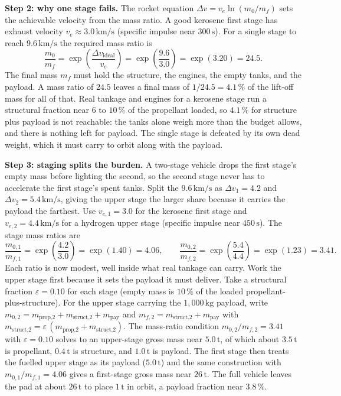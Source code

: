 \textbf{Step 2: why one stage fails.} The rocket equation $\Delta
v=v_{e}\ln(m_{0}/m_{f})$ sets the achievable velocity from the mass
ratio. A good kerosene first stage has exhaust velocity $v_{e}\approx
3.0\,\si{\kilo\meter\per\second}$ (specific impulse near
$300\,\si{\second}$). For a single stage to reach
$9.6\,\si{\kilo\meter\per\second}$ the required mass ratio is
\[
\frac{m_{0}}{m_{f}}=\exp\!\left(\frac{\Delta v_{\text{ideal}}}{v_{e}}
\right)=\exp\!\left(\frac{9.6}{3.0}\right)=\exp(3.20)=24.5.
\]
The final mass $m_{f}$ must hold the structure, the engines, the empty
tanks, and the payload. A mass ratio of $24.5$ leaves a final mass of
$1/24.5=4.1\,\%$ of the lift-off mass for all of that. Real tankage and
engines for a kerosene stage run a structural fraction near $6$ to
$10\,\%$ of the propellant loaded, so $4.1\,\%$ for structure plus
payload is not reachable: the tanks alone weigh more than the budget
allows, and there is nothing left for payload. The single stage is
defeated by its own dead weight, which it must carry to orbit along
with the payload.

\textbf{Step 3: staging splits the burden.} A two-stage vehicle drops
the first stage's empty mass before lighting the second, so the second
stage never has to accelerate the first stage's spent tanks. Split the
$9.6\,\si{\kilo\meter\per\second}$ as $\Delta v_{1}=4.2$ and $\Delta
v_{2}=5.4\,\si{\kilo\meter\per\second}$, giving the upper stage the
larger share because it carries the payload the farthest. Use $v_{e,1}=
3.0$ for the kerosene first stage and $v_{e,2}=4.4\,\si{\kilo\meter\per
\second}$ for a hydrogen upper stage (specific impulse near
$450\,\si{\second}$). The stage mass ratios are
\[
\frac{m_{0,1}}{m_{f,1}}=\exp\!\left(\frac{4.2}{3.0}\right)=\exp(1.40)=
4.06,\qquad
\frac{m_{0,2}}{m_{f,2}}=\exp\!\left(\frac{5.4}{4.4}\right)=\exp(1.23)=
3.41.
\]
Each ratio is now modest, well inside what real tankage can carry.
Work the upper stage first because it sets the payload it must deliver.
Take a structural fraction $\varepsilon=0.10$ for each stage (empty
mass is $10\,\%$ of the loaded propellant-plus-structure). For the
upper stage carrying the $1{,}000\,\si{\kilogram}$ payload, write
$m_{0,2}=m_{\text{prop,2}}+m_{\text{struct,2}}+m_{\text{pay}}$ and
$m_{f,2}=m_{\text{struct,2}}+m_{\text{pay}}$ with
$m_{\text{struct,2}}=\varepsilon\,(m_{\text{prop,2}}+m_{\text{struct,2}})$.
The mass-ratio condition $m_{0,2}/m_{f,2}=3.41$ with $\varepsilon=0.10$
solves to an upper-stage gross mass near $5.0\,\si{\tonne}$, of which
about $3.5\,\si{\tonne}$ is propellant, $0.4\,\si{\tonne}$ is structure,
and $1.0\,\si{\tonne}$ is payload. The first stage then treats the
fuelled upper stage as its payload ($5.0\,\si{\tonne}$) and the same
construction with $m_{0,1}/m_{f,1}=4.06$ gives a first-stage gross mass
near $26\,\si{\tonne}$. The full vehicle leaves the pad at about
$26\,\si{\tonne}$ to place $1\,\si{\tonne}$ in orbit, a payload
fraction near $3.8\,\%$.

